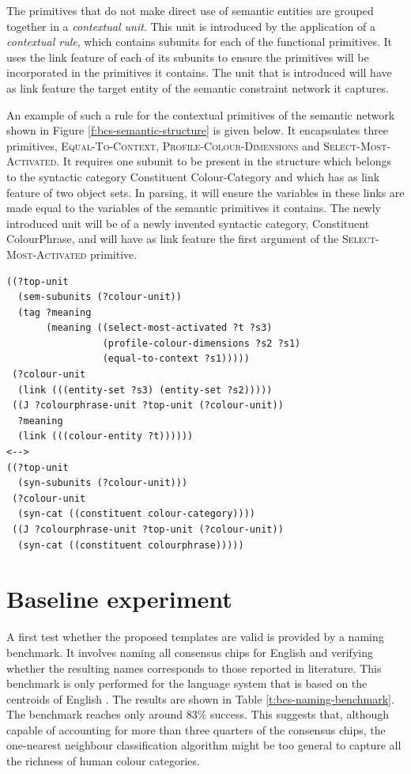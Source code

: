 The primitives that do not make direct use of semantic entities are
grouped together in a \emph{contextual unit}. This unit is introduced
by the application of a \emph{contextual rule}, which contains
subunits for each of the functional primitives. It uses the link
feature of each of its subunits to ensure the primitives will be
incorporated in the primitives it contains. The unit that is
introduced will have as link feature the target entity of the semantic
constraint network it captures.

An example of such a rule for the contextual primitives of the
semantic network shown in Figure \ref{f:bcs-semantic-structure} is
given below. It encapsulates three primitives,
\textsc{Equal-To-Context}, \textsc{Profile-Colour-Dimensions} and
\textsc{Select-Most-Activated}. It requires one subunit to be present
in the structure which belongs to the syntactic category Constituent
Colour-Category and which has as link feature of two object sets. In
parsing, it will ensure the variables in these links are made equal to
the variables of the semantic primitives it contains. The newly
introduced unit will be of a newly invented syntactic category,
Constituent ColourPhrase, and will have as link feature the first
argument of the \textsc{Select-Most-Activated} primitive.

\footnotesize
\begin{Verbatim}[frame=lines, label=ColourPhrase rule for Basic Colour Strategy]
((?top-unit
  (sem-subunits (?colour-unit))
  (tag ?meaning
       (meaning ((select-most-activated ?t ?s3)
                 (profile-colour-dimensions ?s2 ?s1)
                 (equal-to-context ?s1)))))
 (?colour-unit
  (link (((entity-set ?s3) (entity-set ?s2)))))
 ((J ?colourphrase-unit ?top-unit (?colour-unit))
  ?meaning
  (link (((colour-entity ?t))))))
<-->
((?top-unit 
  (syn-subunits (?colour-unit)))
 (?colour-unit 
  (syn-cat ((constituent colour-category))))
 ((J ?colourphrase-unit ?top-unit (?colour-unit))
  (syn-cat ((constituent colourphrase)))))
\end{Verbatim}
\normalsize

\section{Baseline experiment}
\label{s:basic-baseline-experiment}

A first test whether the proposed templates are valid is provided by a
naming benchmark. It
involves naming all consensus chips for English
\citep{sturges95location} and verifying whether the resulting names
corresponds to those reported in literature. This benchmark is only
performed for the language system that is based on the centroids of
English \citep{sturges95location}. The results are shown in Table
\ref{t:bcs-naming-benchmark}. The benchmark reaches only around 83\%
success.  This suggests that, although capable of accounting for more
than three quarters of the consensus chips, the one-nearest neighbour
classification algorithm might be too general to capture all the
richness of human colour categories.

